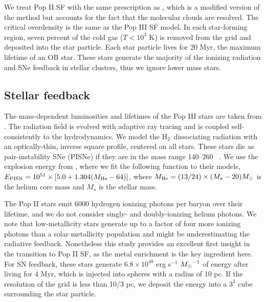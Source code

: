 \documentclass[12pt]{article}
\newcommand{\hh}{H$_2$}
\newcommand{\Ms}{\ifmmode{M_\odot}\else{$M_\odot$}\fi}
\begin{document}
%

We treat Pop II SF with the same prescription as \cite{Wise09}, which
is a modified version of the \cite{Cen92} method but accounts for the
fact that the molecular clouds are resolved.  The critical overdensity
is the same as the Pop III SF model.  In each star-forming region,
seven percent of the cold gas ($T < 10^3$ K) is removed from the grid
and deposited into the star particle.  Each star particle lives for 20
Myr, the maximum lifetime of an OB star.  These stars generate the
majority of the ionizing radiation and SNe feedback in stellar
clusters, thus we ignore lower mass stars.

\subsection*{Stellar feedback}

The mass-dependent luminosities and lifetimes of the Pop III stars are
taken from \cite{Schaerer02}.  The radiation field is evolved with
adaptive ray tracing \cite{Abel02_RT, Wise10} and is coupled
self-consistently to the hydrodynamics.  We model the \hh~dissociating
radiation with an optically-thin, inverse square profile, centered on
all stars.  These stars die as pair-instability SNe (PISNe) if they
are in the mass range 140--260 \Ms~\cite{Heger03}.  We use the
explosion energy from \cite{Heger02}, where we fit the following
function to their models, $E_{\rm PISN} = 10^{51} \times [5.0 + 1.304
(M_{\rm He} - 64)]$, where $M_{\rm He} = (13/24) \times (M_\star - 20)
\Ms$ is the helium core mass and $M_\star$ is the stellar mass.

The Pop II stars emit 6000 hydrogen ionizing photons per baryon over
their lifetime, and we do not consider singly- and doubly-ionizing
helium photons.  We note that low-metallicity stars generate up to a
factor of four more ionizing photons than a solar metallicity
population \cite{Schaerer03} and might be underestimating the
radiative feedback.  Nonetheless this study provides an excellent
first insight in the transition to Pop II SF, as the metal enrichment
is the key ingredient here.  For SN feedback, these stars generate
$6.8 \times 10^{48}$ erg s$^{-1}$ $\Ms^{-1}$ of energy after living
for 4 Myr, which is injected into spheres with a radius of 10 pc.  If
the resolution of the grid is less than 10/3 pc, we deposit the energy
into a $3^3$ cube surrounding the star particle.


\end{document}
